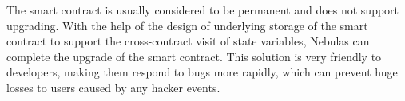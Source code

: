 
The smart contract is usually considered to be permanent and does not support upgrading. With the help of the design of underlying storage of the smart contract to support the cross-contract visit of state variables, Nebulas can complete the upgrade of the smart contract. This solution is very friendly to developers, making them respond to bugs more rapidly, which can prevent huge losses to users caused by any hacker events.





